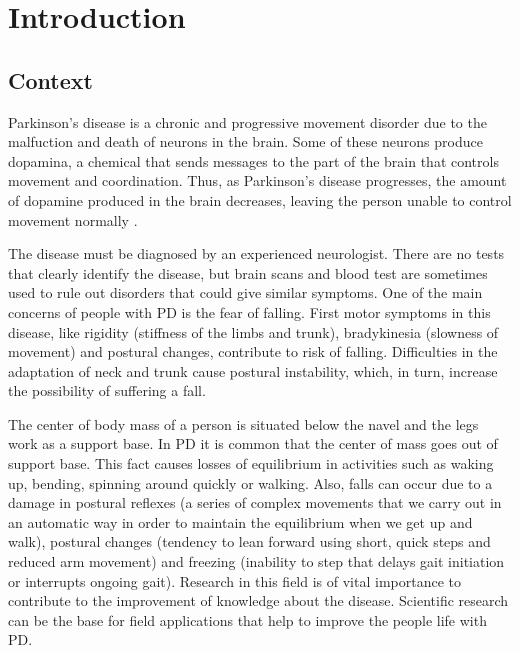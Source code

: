
\chapter{Introduction}
\label{ch:Introduction}

\section{Context}
Parkinson’s disease is a chronic and progressive movement disorder due to the malfuction and death of neurons in the brain. Some of these neurons produce dopamina, a chemical that sends messages to the part of the brain that controls movement and coordination. Thus, as Parkinson’s disease progresses,  the amount of dopamine produced in the brain decreases, leaving the person unable to control movement normally \cite{pdf}.

The disease must be diagnosed by an experienced neurologist. There are no tests that clearly identify the disease, but brain scans and blood test are sometimes used to rule out disorders that could give similar symptoms. 
One of the main concerns of people with PD is the fear of falling. First motor symptoms in this disease, like rigidity (stiffness  of the limbs and trunk), bradykinesia (slowness of movement) and postural changes, contribute to  risk of falling. Difficulties in the adaptation of neck and trunk cause  postural instability, which, in turn, increase the possibility of suffering a fall.

The center of body mass of a person is situated below the navel and the legs work as a support base. In PD it is common that the center of  mass goes out of support base. This fact causes losses of equilibrium in activities such as waking up, bending, spinning  around quickly or walking. Also, falls can occur due to a damage in postural reflexes (a series of complex movements that we carry out in an automatic way in order to maintain the equilibrium when we get up and walk), postural changes (tendency to lean forward using short, quick steps and reduced arm movement) and freezing (inability to step that delays gait initiation or interrupts ongoing gait). Research in this field is of vital importance to contribute to the improvement of knowledge about the disease. Scientific research can be the base for  field applications that help to improve the people life with PD. \cite{ParkinsonDisease}\cite{pdf}

